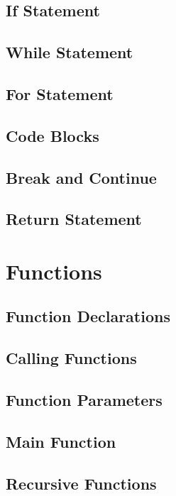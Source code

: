 \documentclass{article}
\begin{document}
\subsection{If Statement}

\subsection{While Statement}

\subsection{For Statement}

\subsection{Code Blocks}

\subsection{Break and Continue}

\subsection{Return Statement}

\section{Functions}

\subsection{Function Declarations}

\subsection{Calling Functions}

\subsection{Function Parameters}

\subsection{Main Function}

\subsection{Recursive Functions}
\end{document}
